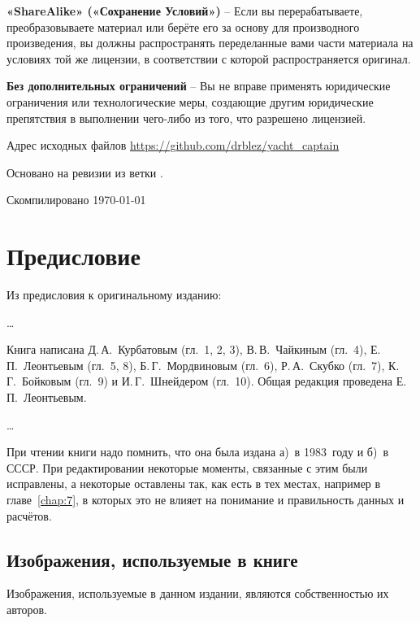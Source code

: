 \documentclass[a4paper, 12pt, twoside, final, book, russian, fittopage, cyremdash, openright]{ncc}
\begin{document}
\ccsa \textbf{«ShareAlike» («Сохранение Условий»)} \--- Если вы
перерабатываете, преобразовываете материал или берёте его за основу
для производного произведения, вы должны распространять переделанные
вами части материала на условиях той же лицензии, в соответствии с
которой распространяется оригинал.

\textbf{Без дополнительных ограничений} \--- Вы не вправе применять
юридические ограничения или технологические меры, создающие другим
юридические препятствия в выполнении чего-либо из того, что разрешено
лицензией.

Адрес исходных файлов \url{https://github.com/drblez/yacht_captain}

Основано на ревизии \texttt{\commit} из ветки \texttt{\branch}.

Скомпилировано \today

\tableofcontents
\listoffigures
\listoftables

\mainmatter

\chapter*{Предисловие}

Из предисловия к оригинальному изданию:

\ldots

Книга написана Д.\,А.~Курбатовым (гл.~1, 2, 3), В.\,В.~Чайкиным
(гл.~4), Е.\,П.~Леонтьевым (гл.~5, 8), Б.\,Г.~Мордвиновым (гл.~6),
Р.\,А.~Скубко (гл.~7), К.\,Г.~Бойковым (гл.~9) и И.\,Г.~Шнейдером
(гл.~10). Общая редакция проведена Е.\,П.~Леонтьевым.

\ldots

При чтении книги надо помнить, что она была издана а)~в 1983~году и
б)~в СССР.  При редактировании некоторые моменты, связанные с этим
были исправлены, а некоторые оставлены так, как есть в тех местах,
например в главе~\ref{chap:7}, в которых это не влияет на понимание и
правильность данных и расчётов.

\section*{Изображения, используемые в книге}

Изображения, используемые в данном издании, являются собственностью их авторов.
\end{document}
